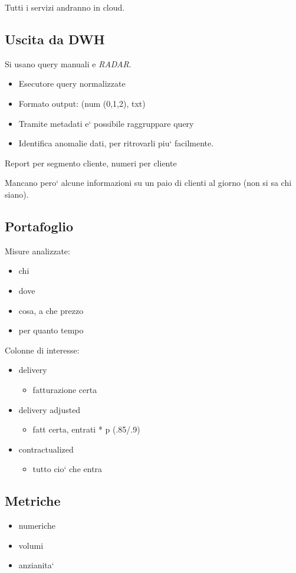     Tutti i servizi andranno in cloud.

    \subsection{Uscita da DWH}
        Si usano query manuali e \textit{RADAR}.
        \begin{itemize}
            \item Esecutore query normalizzate
            \item Formato output: (num (0,1,2), txt)
            \item Tramite metadati e` possibile raggruppare query
            \item Identifica anomalie dati, per ritrovarli piu` facilmente.
        \end{itemize}

        Report per segmento cliente, numeri per cliente
	    
	    Mancano pero` alcune informazioni su un paio di clienti al giorno (non si sa chi siano).
    
    \subsection{Portafoglio}
        Misure analizzate:
        \begin{itemize}
            \item chi
            \item dove
            \item cosa, a che prezzo
            \item per quanto tempo
        \end{itemize}
        
        Colonne di interesse:
        \begin{itemize}
            \item delivery
            \begin{itemize}
                \item fatturazione certa
            \end{itemize}
            
            \item delivery adjusted
            \begin{itemize}
                \item fatt certa, entrati * p (.85/.9)
            \end{itemize}
            
            \item contractualized
            \begin{itemize}
                \item tutto cio` che entra
            \end{itemize}
        \end{itemize}

    \subsection{Metriche}
        \begin{itemize}
            \item numeriche
            \item volumi
            \item anzianita`
        \end{itemize}
